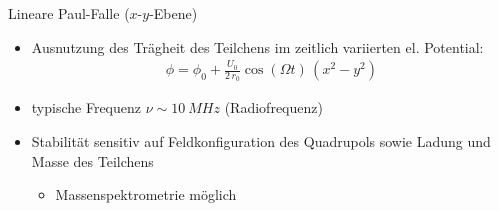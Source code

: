 \documentclass[12pt,xcolor=dvipsnames]{beamer}
\begin{document}
%		

\begin{frame}{Lineare Paul-Falle ($x$-$y$-Ebene)}
	\begin{itemize}
		\item Ausnutzung des Trägheit des Teilchens im zeitlich variierten el. Potential:
		\begin{align}
		\phi = \phi_0 + \frac{U_0}{2 \, r_0} \cos(\Omega t) \, (x^2-y^2)
		\end{align}
		
		\item typische Frequenz $\nu \sim \SI{10}{MHz}$ (Radiofrequenz)
		
		\item Stabilität sensitiv auf Feldkonfiguration des Quadrupols sowie Ladung und Masse des Teilchens
		\begin{itemize}
			\item Massenspektrometrie möglich
		\end{itemize}
	\end{itemize}
\end{frame}
\end{document}

